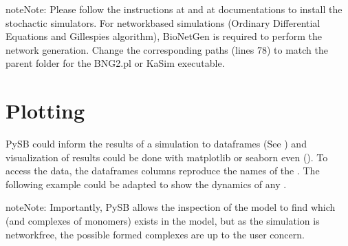 \documentclass[letterpaper,10pt,english]{sphinxmanual}
\begin{document}
\begin{sphinxVerbatim}[commandchars=\\\{\},numbers=left,firstnumber=1,stepnumber=1]
  
    
	  \PYG{p}{[}\PYG{p}{]}
    

  
    
	  \PYG{p}{[}\PYG{p}{]}  
    
\end{sphinxVerbatim}
\sphinxresetverbatimhllines

\begin{sphinxadmonition}{note}{Note:}
Please follow the instructions at 
and at  documentations to install
the stochactic simulators. For network\sphinxhyphen{}based simulations (Ordinary Differential
Equations and Gillespie\textasciigrave{}s algorithm), BioNetGen is required to perform the network
generation. Change the corresponding paths (lines 7\sphinxhyphen{}8) to match the parent folder for
the BNG2.pl or KaSim executable.
\end{sphinxadmonition}


\chapter{Plotting}
\label{\detokenize{Plotting:plotting}}\label{\detokenize{Plotting:plotting-page}}\label{\detokenize{Plotting::doc}}
PySB could inform the results of a simulation to dataframes (See
{\hyperref[\detokenize{Simulation:simulation-page}]{}}) and visualization of results could be done with
matplotlib or seaborn even (). To
access the data, the dataframes columns reproduce the names of the .
The following example could be adapted to show the dynamics of any .

\begin{sphinxadmonition}{note}{Note:}
Importantly, PySB allows the inspection of the model to find which
 (and complexes of monomers) exists in the model, but as the
simulation is network\sphinxhyphen{}free, the possible formed complexes are up to the user
concern.
\end{sphinxadmonition}
\end{document}
